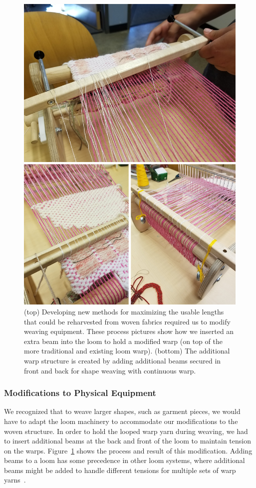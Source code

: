 \begin{figure}
    \centering
    \includegraphics[width=0.8\linewidth]{figs/UF_loommod.png}
    \caption[Development of loom modifications for weaving unravel-able fabrics.]{(top) Developing new methods for maximizing the usable lengths that could be reharvested from woven fabrics required us to modify weaving equipment. These process pictures show how we inserted an extra beam into the loom to hold a modified warp (on top of the more traditional and existing loom warp). (bottom) The additional warp structure is created by adding additional beams secured in front and back for shape weaving with continuous warp.}
    \label{fig:loomMod}
\end{figure}

\subsubsection{Modifications to Physical Equipment}

We recognized that to weave larger shapes, such as garment pieces, we would have to adapt the loom machinery to accommodate our modifications to the woven structure. In order to hold the looped warp yarn during weaving, we had to insert additional beams at the back and front of the loom to maintain tension on the warps. Figure~\ref{fig:loomMod} shows the process and result of this modification. Adding beams to a loom has some precedence in other loom systems, where additional beams might be added to handle different tensions for multiple sets of warp yarns~\cite{essen_easysupp_2016}.

